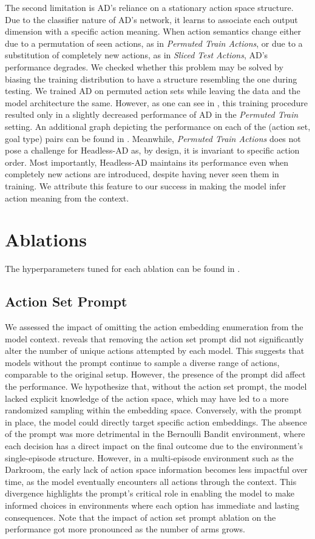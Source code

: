 \documentclass{article}
\theoremstyle{plain}
\theoremstyle{definition}
\theoremstyle{remark}
\begin{document}
The second limitation is AD's reliance on a stationary action space structure. Due to the classifier nature of AD's network, it learns to associate each output dimension with a specific action meaning. When action semantics change either due to a permutation of seen actions, as in \textit{Permuted Train Actions}, or due to a substitution of completely new actions, as in \textit{Sliced Test Actions}, AD's performance degrades. We checked whether this problem may be solved by biasing the training distribution to have a structure resembling the one during testing. We trained AD on permuted action sets while leaving the data and the model architecture the same. However, as one can see in , this training procedure resulted only in a slightly decreased performance of AD in the \textit{Permuted Train} setting. An additional graph depicting the performance on each of the (action set, goal type) pairs can be found in . Meanwhile, \textit{Permuted Train Actions} does not pose a challenge for Headless-AD as, by design, it is invariant to specific action order. Most importantly, Headless-AD maintains its performance even when completely new actions are introduced, despite having never seen them in training. We attribute this feature to our success in making the model infer action meaning from the context.
\section{Ablations}
\label{section:ablations}
The hyperparameters tuned for each ablation can be found in .
\subsection{Action Set Prompt}
We assessed the impact of omitting the action embedding enumeration from the model context.
 reveals that removing the action set prompt did not significantly alter the number of unique actions attempted by each model. This suggests that models without the prompt continue to sample a diverse range of actions, comparable to the original setup. However, the presence of the prompt did affect the performance. We hypothesize that,
without the action set prompt, the model lacked explicit knowledge of the action space, which may have led to a more randomized sampling within the embedding space. Conversely, with the prompt in place, the model could directly target specific action embeddings.
The absence of the prompt was more detrimental in the Bernoulli Bandit environment, where each decision has a direct impact on the final outcome due to the environment's single-episode structure. However, in a multi-episode environment such as the Darkroom, the early lack of action space information becomes less impactful over time, as the model eventually encounters all actions through the context. This divergence highlights the prompt's critical role in enabling the model to make informed choices in environments where each option has immediate and lasting consequences. Note that the impact of action set prompt ablation on the performance got more pronounced as the number of arms grows.
\end{document}
